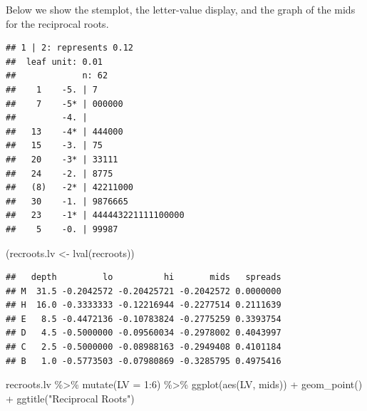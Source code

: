 \documentclass[
]{book}
\newenvironment{Shaded}{\begin{snugshade}}{\end{snugshade}}
\newcommand{\AttributeTok}[1]{\textcolor[rgb]{0.77,0.63,0.00}{#1}}
\newcommand{\DecValTok}[1]{\textcolor[rgb]{0.00,0.00,0.81}{#1}}
\newcommand{\FunctionTok}[1]{\textcolor[rgb]{0.00,0.00,0.00}{#1}}
\newcommand{\NormalTok}[1]{#1}
\newcommand{\OtherTok}[1]{\textcolor[rgb]{0.56,0.35,0.01}{#1}}
\newcommand{\SpecialCharTok}[1]{\textcolor[rgb]{0.00,0.00,0.00}{#1}}
\newcommand{\StringTok}[1]{\textcolor[rgb]{0.31,0.60,0.02}{#1}}
\begin{document}
Below we show the stemplot, the letter-value display, and the graph of the mids for the reciprocal roots.

\begin{Shaded}
\end{Shaded}

\begin{verbatim}
## 1 | 2: represents 0.12
##  leaf unit: 0.01
##             n: 62
##    1    -5. | 7
##    7    -5* | 000000
##         -4. | 
##   13    -4* | 444000
##   15    -3. | 75
##   20    -3* | 33111
##   24    -2. | 8775
##   (8)   -2* | 42211000
##   30    -1. | 9876665
##   23    -1* | 444443221111100000
##    5    -0. | 99987
\end{verbatim}

\begin{Shaded}
\begin{Highlighting}[]
\NormalTok{(recroots.lv }\OtherTok{\textless{}{-}} \FunctionTok{lval}\NormalTok{(recroots))}
\end{Highlighting}
\end{Shaded}

\begin{verbatim}
##   depth         lo          hi       mids   spreads
## M  31.5 -0.2042572 -0.20425721 -0.2042572 0.0000000
## H  16.0 -0.3333333 -0.12216944 -0.2277514 0.2111639
## E   8.5 -0.4472136 -0.10783824 -0.2775259 0.3393754
## D   4.5 -0.5000000 -0.09560034 -0.2978002 0.4043997
## C   2.5 -0.5000000 -0.08988163 -0.2949408 0.4101184
## B   1.0 -0.5773503 -0.07980869 -0.3285795 0.4975416
\end{verbatim}

\begin{Shaded}
\begin{Highlighting}[]
\NormalTok{recroots.lv }\SpecialCharTok{\%\textgreater{}\%} \FunctionTok{mutate}\NormalTok{(}\AttributeTok{LV =} \DecValTok{1}\SpecialCharTok{:}\DecValTok{6}\NormalTok{) }\SpecialCharTok{\%\textgreater{}\%} 
  \FunctionTok{ggplot}\NormalTok{(}\FunctionTok{aes}\NormalTok{(LV, mids)) }\SpecialCharTok{+}
  \FunctionTok{geom\_point}\NormalTok{() }\SpecialCharTok{+} \FunctionTok{ggtitle}\NormalTok{(}\StringTok{"Reciprocal Roots"}\NormalTok{)}
\end{Highlighting}
\end{Shaded}
\end{document}
